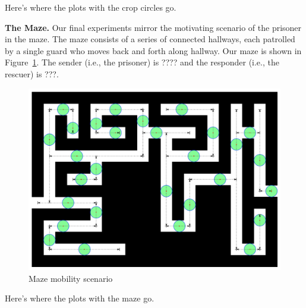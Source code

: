 {\color{red}Here's where the plots with the crop circles go.}

{\bf The Maze.} Our final experiments mirror the motivating scenario
of the prisoner in the maze. The maze consists of a series of
connected hallways, each patrolled by a single guard who moves back
and forth along hallway. Our maze is shown in
Figure~\ref{fig:maze}. {\color{red}The sender (i.e., the prisoner) is ???? and the
  responder (i.e., the rescuer) is ???.}
\begin{figure}
\begin{center}
\includegraphics[width=.9\columnwidth]{figures/maze_diagram.pdf}
\end{center}
\vspace{-.75cm}
\caption{Maze mobility scenario}
\label{fig:maze}
\vspace{-.5cm}
\end{figure}

{\color{red}Here's where the plots with the maze go.}